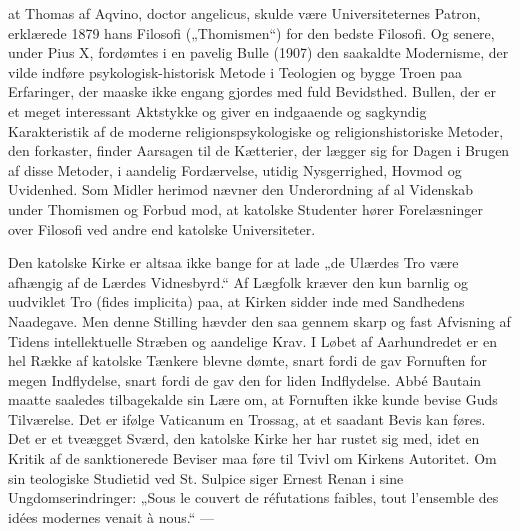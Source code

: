 \documentclass[12pt,a4paper,openany]{book}
\begin{document}
at Thomas af Aqvino, doctor angelicus, skulde være Universiteternes
Patron, erklærede 1879 hans Filosofi („Thomismen“) for
den bedste Filosofi. Og senere, under Pius X, fordømtes i en pavelig
Bulle (1907) den saakaldte Modernisme, der vilde indføre psykologisk-historisk Metode i Teologien og bygge Troen paa Erfaringer,
der maaske ikke engang gjordes med fuld Bevidsthed. Bullen, der
er et meget interessant Aktstykke og giver en indgaaende og sagkyndig
Karakteristik af de moderne religionspsykologiske og religionshistoriske
Metoder, den forkaster, finder Aarsagen til de Kætterier,
der lægger sig for Dagen i Brugen af disse Metoder, i aandelig
Fordærvelse, utidig Nysgerrighed, Hovmod og Uvidenhed. Som Midler
herimod nævner den Underordning af al Videnskab under
Thomismen og Forbud mod, at katolske Studenter hører Forelæsninger
over Filosofi ved andre end katolske Universiteter.

Den katolske Kirke er altsaa ikke bange for at lade „de Ulærdes
Tro være afhængig af de Lærdes Vidnesbyrd.“ Af Lægfolk kræver
den kun barnlig og uudviklet Tro (fides implicita) paa, at Kirken
sidder inde med Sandhedens Naadegave. Men denne Stilling hævder
den saa gennem skarp og fast Afvisning af Tidens intellektuelle Stræben
og aandelige Krav. I Løbet af Aarhundredet er en hel Række af
katolske Tænkere blevne dømte, snart fordi de gav Fornuften for
megen Indflydelse, snart fordi de gav den for liden Indflydelse. Abbé
Bautain maatte saaledes tilbagekalde sin Lære om, at Fornuften ikke
kunde bevise Guds Tilværelse. Det er ifølge Vaticanum en Trossag,
at et saadant Bevis kan føres. Det er et tveægget Sværd, den katolske
Kirke her har rustet sig med, idet en Kritik af de sanktionerede Beviser
maa føre til Tvivl om Kirkens Autoritet. Om sin teologiske
Studietid ved St. Sulpice siger Ernest Renan i sine Ungdomserindringer:
„Sous le couvert de réfutations faibles, tout l’ensemble des idées
modernes venait à nous.“ ---
\end{document}
